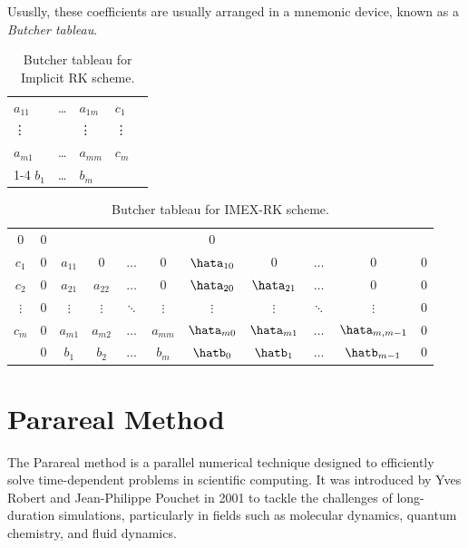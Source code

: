 Ususlly, these coefficients are usually arranged 
in a mnemonic device, known as a \emph{Butcher tableau}. 
\begin{table}[h]
    \begin{center}
    \begin{tabular}{lll|ll}
    $a_{11}$  &\ldots &$a_{1m}$ &$c_1$  &  \\
    \vdots    &       &\vdots   &\vdots &  \\
    $a_{m1}$  &\ldots &$a_{mm}$ &$c_m$  &  \\ \cline{1-4}
    $b_{1}$   &\ldots & $b_{m}$ & &
    \end{tabular}
    \end{center}
    \caption{Butcher tableau for Implicit RK scheme.}\label{tab:RK}
    \end{table}
    \begin{table}[h]
        \centering
        \begin{tabular}[h]{c|ccccc|ccccc}
            $0$ & $0$ & & & & & $0$ \\
            $c_1$ & $0$& $a_{11}$ & $0$ & $\dots$ & $0$ & $\hata_{10}$ & $0$ & $\dots$ & $0$& $0$ \\
            $c_2$ & $0$& $a_{21}$ & $a_{22}$  & $\dots$ & $0$ & $\hata_{20}$ & $\hata_{21}$ & $\dots$ & $0$ & $0$\\
            $\vdots$ & $0$& $\vdots$ & $\vdots$  & $\ddots$ & $\vdots$ & $\vdots$ & $\vdots$ & $\ddots$ & $\vdots$ & $0$\\
            $c_m$ & $0$& $a_{m1}$ & $a_{m2}$  & $\dots$ & $a_{mm}$ & $\hata_{m0}$ & $\hata_{m1}$ & $\dots$ & $\hata_{m,m-1}$ & $0$\\
            \hline
            & $0$& $b_1$ & $b_2$ & $\dots$ & $b_m$ & $\hatb_0$ & $\hatb_1$ & $\dots$ & $\hatb_{m-1}$& $0$
        \end{tabular}
        \caption{Butcher tableau for IMEX-RK scheme.}
        \label{tab:Butcher}
    \end{table}
    

\section{Parareal Method}

The Parareal method is a parallel numerical technique designed to efficiently solve time-dependent problems in scientific computing. It was introduced by Yves Robert and Jean-Philippe Pouchet in 2001 to tackle the challenges of long-duration simulations, particularly in fields such as molecular dynamics, quantum chemistry, and fluid dynamics.


